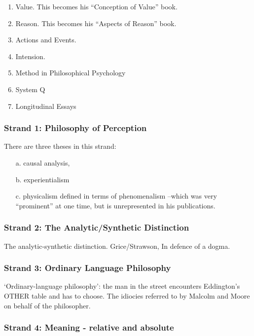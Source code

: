 \documentclass[10pt,titlepage]{book}
\begin{document}
\begin{enumerate}
\item Value. This becomes his ``Conception of Value'' book.

\item Reason. This becomes his ``Aspects of Reason'' book.

\item Actions and Events.

\item Intension.

\item Method in Philosophical Psychology

\item System Q

\item Longitudinal Essays

\end{enumerate}

\subsubsection{Strand 1: Philosophy of Perception}

There are three theses in this strand:
\begin{itemize}
\item[a.] causal analysis,
\item[b.] experientialism
\item[c.] physicalism defined in terms of phenomenalism
--which was very ``prominent'' at one time, but is unrepresented in his
publications.
\end{itemize}

\subsubsection{Strand 2: The Analytic/Synthetic Distinction}

The analytic-synthetic distinction.
Grice/Strawson, In defence of a
dogma.

\subsubsection{Strand 3: Ordinary Language Philosophy}

`Ordinary-language philosophy': the man in the street encounters
Eddington's OTHER table and has to choose. The idiocies referred to by
Malcolm and Moore on behalf of the philosopher.

\subsubsection{Strand 4: Meaning - relative and absolute}
\end{document}
